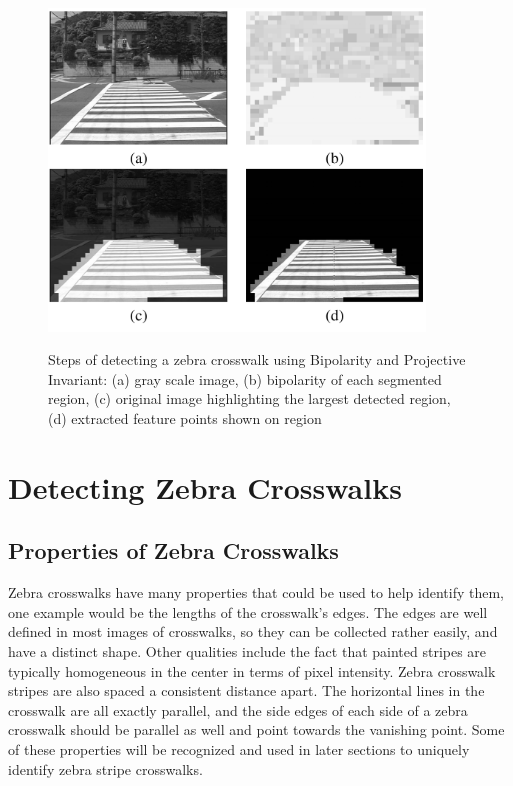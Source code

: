 \documentclass[12pt]{ucthesis}
\newcommand{\captionfonts}{\small\bf\ssp}
\begin{document}
\begin{figure}[t]
\begin{center}
\includegraphics[width=10cm]{BipolarCrosswalk.png}
\captionfonts
\caption[Bipolarity and Projective Invariant detection example]{Steps of detecting a zebra crosswalk using Bipolarity and Projective Invariant: (a) gray scale image, (b) bipolarity of each segmented region, (c) original image highlighting the largest detected region, (d) extracted feature points shown on region}
\label{fig:BipolarCrosswalk}
\end{center}
\end{figure}




\chapter{Detecting Zebra Crosswalks}

\section{Properties of Zebra Crosswalks}

Zebra crosswalks have many properties that could be used to help identify them, one example would be the lengths of the crosswalk's edges. The edges are well defined in most images of crosswalks, so they can be collected rather easily, and have a distinct shape. Other qualities include the fact that painted stripes are typically homogeneous in the center in terms of pixel intensity. Zebra crosswalk stripes are also spaced a consistent distance apart. The horizontal lines in the crosswalk are all exactly parallel, and the side edges of each side of a zebra crosswalk should be parallel as well and point towards the vanishing point. Some of these properties will be recognized and used in later sections to uniquely identify zebra stripe crosswalks. 
\end{document}
